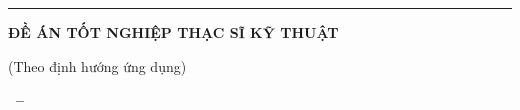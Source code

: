 \begin{titlepage}
\thispagestyle{empty}
\centering
\singlespacing

{\large\bfseries \thesisInstitution\par}
\vspace{2pt}
{\rule{0.55\textwidth}{0.8pt}\par}

\vspace{3.2cm}

{\Large\bfseries \thesisAuthor\par}

\vspace{2.6cm}

{\large\bfseries \thesisTitle\par}

\vspace{2.6cm}

{\large\bfseries ĐỀ ÁN TỐT NGHIỆP THẠC SĨ KỸ THUẬT\par}
\vspace{4pt}
{\normalsize (Theo định hướng ứng dụng)\par}

\vfill

{\large\bfseries \thesisCity\ --\ \thesisYear\par}
\end{titlepage}

